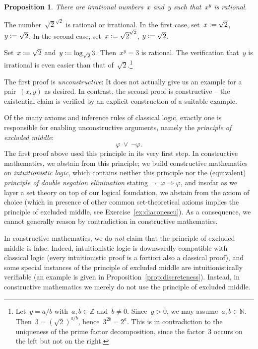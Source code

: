\documentclass[10pt,reqno,a4paper,openany]{amsbook}
\makeatletter
\theoremstyle{definition}
\theoremstyle{plain}
\newtheorem{prop}[defn]{Proposition}
\theoremstyle{remark}
\newcommand{\ZZ}{\mathbb{Z}}
\newcommand{\NN}{\mathbb{N}}
\newcommand{\?}{\,{:}\,}
\renewcommand{\_}{\mathpunct{.}\,}
\newcommand{\defeq}{\vcentcolon=}
\renewenvironment{proof}[1][\proofname]{\par
  \pushQED{\qed}%
  \normalfont \topsep6\p@\@plus6\p@\relax
  \trivlist
  \item[\hskip\labelsep
        \itshape
    #1\@addpunct{.}]\ignorespaces
}{%
  \popQED\endtrivlist\@endpefalse
}
\makeatother
\begin{document}
\begin{prop}There are irrational numbers~$x$ and~$y$ such that~$x^y$ is
rational.
\end{prop}
\begin{proof}[First proof] The number~$\sqrt{2}^{\sqrt{2}}$ is rational or
irrational. In the first case, set~$x \defeq \sqrt{2}$, $y \defeq \sqrt{2}$.
In the second case, set~$x \defeq \sqrt{2}^{\sqrt{2}}$, $y \defeq \sqrt{2}$.
\end{proof}
\begin{proof}[Second proof] Set~$x \defeq \sqrt{2}$ and~$y \defeq \log_{\sqrt{2}} 3$.
Then~$x^y = 3$ is rational. The verification that~$y$ is irrational is even
easier than that of~$\sqrt{2}$.\footnote{Let~$y = a/b$ with~$a, b \in \ZZ$
and~$b \neq 0$. Since~$y > 0$, we may assume~$a, b \in \NN$. Then~$3 =
(\sqrt{2})^{a/b}$, hence~$3^{2b} = 2^a$. This is in contradiction to the
uniqueness of the prime factor decomposition, since the factor~$3$ occurs on
the left but not on the right.}
\end{proof}

The first proof is \emph{unconstructive}: It does not actually give us an
example for a pair~$(x,y)$ as desired. In contrast, the second proof is
constructive -- the existential claim is verified by an explicit construction
of a suitable example.

Of the many axioms and inference rules of classical logic, exactly one is
responsible for enabling unconstructive arguments, namely the \emph{principle
of excluded middle}:
\[ \varphi \ \vee\ \neg\varphi. \]
The first proof above used this principle in its very first step. In
constructive mathematics, we abstain from this principle; we build
constructive mathematics on \emph{intuitionistic logic}, which contains neither
this principle nor the (equivalent) \emph{principle of double negation
elimination} stating~$\neg\neg\varphi \Rightarrow \varphi$, and insofar as we
layer a set theory on top of our logical foundation, we abstain from the axiom
of choice (which in presence of other common set-theoretical axioms implies the
principle of excluded middle, see Exercise~\ref{ex:diaconescu}). As a
consequence, we cannot generally reason by contradiction in constructive mathematics.

In constructive mathematics, we do \emph{not} claim that the principle of
excluded middle is false. \marginpar{\dbend}
Indeed, intuitionistic logic is downwardly compatible
with classical logic (every intuitionistic proof is a fortiori also a classical
proof), and some special instances of the principle of excluded middle are
intuitionistically verifiable (an example is given in
Proposition~\ref{prop:discreteness}). Instead, in constructive mathematics we
merely do not use the principle of excluded middle.
\end{document}
